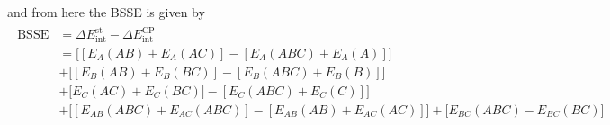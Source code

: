 and from here the BSSE  is given by
\small{
\begin{align}
    \begin{split}
    \text{BSSE} &= \Delta E_{\mathrm{int}}^{\mathrm{st}} - \Delta E_{\mathrm{int}}^{\mathrm{CP}}\\[0.25cm]
    &=\Big[[E_{A}(AB) + E_{A}(AC)] -  [E_{A}(ABC) + E_{A}(A)]\Big]\\[0.25cm]
    &+\Big[[E_{B}(AB) + E_{B}(BC)] -  [E_{B}(ABC) + E_{B}(B)]\Big]\\[0.25cm]
    &+\Big[E_{C}(AC) + E_{C}(BC)] -  [E_{C}(ABC) + E_{C}(C)]\Big]\\[0.25cm]
    &+\Big[[E_{AB}(ABC) + E_{AC}(ABC)]-[E_{AB}(AB)+E_{AC}(AC)]\Big]
    + \Big[E_{BC}(ABC) - E_{BC}(BC)\Big]
    \end{split}
    \label{eq:equation-13}
\end{align}
}
\noindent





        






